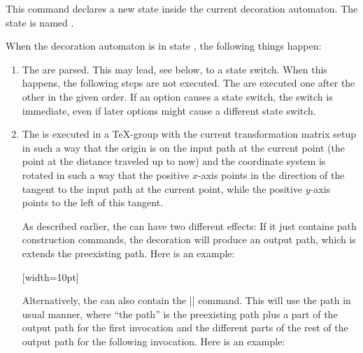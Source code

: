 \begin{command}{\pgfdeclaredecoration{}}
  \begin{command}{\state{}}
    This command declares a new state inside the current decoration
    automaton. The state is named .

    When the decoration automaton is in state , the following things
    happen:
    \begin{enumerate}
    \item
      The  are parsed. This may lead, see below, to a
      state switch. When this happens, the following steps are not
      executed. The  are executed one after the other in
      the given order. If an option causes a state switch, the switch
      is immediate, even if later options might cause a different
      state switch.
    \item
      The  is executed in a \TeX-group with the current
      transformation matrix setup in such a way that the origin is on
      the input path at the current point (the point at the distance
      traveled up to now) and the coordinate system is rotated in
      such a way that the positive $x$-axis points in the direction of
      the tangent to the input path at the current point, while the
      positive $y$-axis points to the left of this tangent.

      As described earlier, the  can have two different
      effects: If it just contains path construction commands, the
      decoration will produce an output path, which is extends the
      preexisting path. Here is an example:

\begin{codeexample}[]
{
  [width=10pt]
  {
    \pgfpathlineto{\pgfpoint{0pt}{5pt}}
    \pgfpathlineto{\pgfpoint{5pt}{5pt}}
    \pgfpathlineto{\pgfpoint{5pt}{-5pt}}
    \pgfpathlineto{\pgfpoint{10pt}{-5pt}}
    \pgfpathlineto{\pgfpoint{10pt}{0pt}}
  }
  {
    \pgfpathlineto{\pgfpointdecoratedpathlast}
  }
}
\end{codeexample}

    Alternatively, the  can also contain the
    |\pgfusepath| command. This will use the path in usual manner,
    where ``the path'' is the preexisting path plus a part of the
    output path for the first invocation and the different parts of
    the rest of the output path for the following invocation. Here is
    an example:


\end{enumerate}
\end{command}
\end{command}
